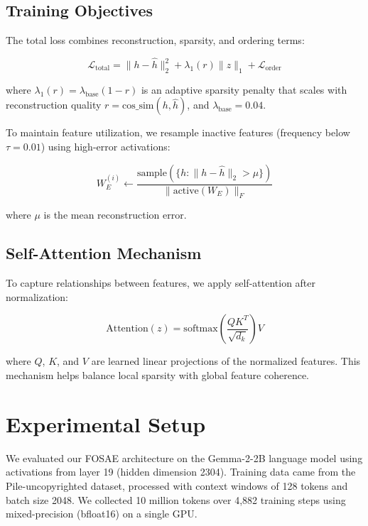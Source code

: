 \documentclass{article} %
\begin{document}
\subsection{Training Objectives}
The total loss combines reconstruction, sparsity, and ordering terms:

\begin{equation}
\mathcal{L}_{\text{total}} = \|h - \hat{h}\|_2^2 + \lambda_1(r)\|z\|_1 + \mathcal{L}_{\text{order}}
\end{equation}

where $\lambda_1(r) = \lambda_{\text{base}}(1 - r)$ is an adaptive sparsity penalty that scales with reconstruction quality $r = \text{cos\_sim}(h, \hat{h})$, and $\lambda_{\text{base}}=0.04$.

To maintain feature utilization, we resample inactive features (frequency below $\tau=0.01$) using high-error activations:

\begin{equation}
W_E^{(i)} \leftarrow \frac{\text{sample}(\{h : \|h - \hat{h}\|_2 > \mu\})}{\|\text{active}(W_E)\|_F}
\end{equation}

where $\mu$ is the mean reconstruction error.

\subsection{Self-Attention Mechanism}
To capture relationships between features, we apply self-attention after normalization:

\begin{equation}
\text{Attention}(z) = \text{softmax}\left(\frac{QK^T}{\sqrt{d_k}}\right)V
\end{equation}

where $Q$, $K$, and $V$ are learned linear projections of the normalized features. This mechanism helps balance local sparsity with global feature coherence.

\section{Experimental Setup}
\label{sec:experimental}

We evaluated our FOSAE architecture on the Gemma-2-2B language model using activations from layer 19 (hidden dimension 2304). Training data came from the Pile-uncopyrighted dataset, processed with context windows of 128 tokens and batch size 2048. We collected 10 million tokens over 4,882 training steps using mixed-precision (bfloat16) on a single GPU.
\end{document}
